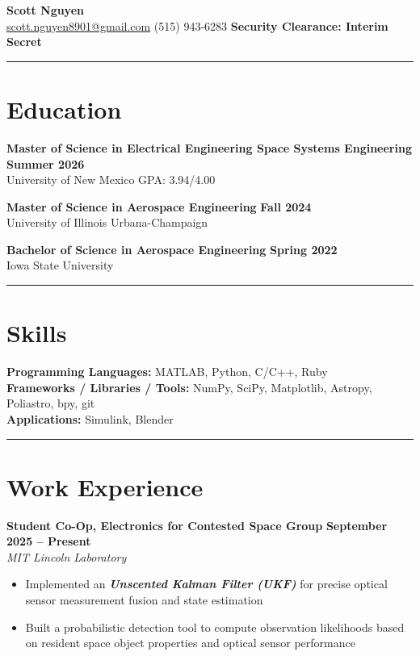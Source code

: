 \documentclass[10pt]{article}
\newcommand{\sectionline}{\noindent\rule{\linewidth}{0.4pt}}
\begin{document}
	
	\begin{center}
		{\color{mygreen}
			{\Huge \textbf{Scott Nguyen}} \\
			\small
			\href{mailto:scott.nguyen8901@gmail.com}{scott.nguyen8901@gmail.com} \textbar
			(515) 943-6283 %
			\textbf{Security Clearance: Interim Secret}
		}
	\end{center}

	\sectionline
	
	\section*{Education}
	
	\textbf{Master of Science in Electrical Engineering \textbar Space Systems Engineering} \hfill \textbf{Summer 2026} \\
	University of New Mexico \hfill GPA: 3.94/4.00
	
	\textbf{Master of Science in Aerospace Engineering} \hfill \textbf{Fall 2024} \\
	University of Illinois Urbana-Champaign
	
	\textbf{Bachelor of Science in Aerospace Engineering} \hfill \textbf{Spring 2022} \\
	Iowa State University
	
	\sectionline
	
	\section*{Skills}
	\textbf{Programming Languages:} MATLAB, Python, C/C++, Ruby \\
	\textbf{Frameworks / Libraries / Tools:} NumPy, SciPy, Matplotlib, Astropy, Poliastro, bpy, git \\
	\textbf{Applications:} Simulink, Blender
	
	\sectionline
	
	\section*{Work Experience}

	\textbf{Student Co-Op, Electronics for Contested Space Group} \hfill \textbf{September 2025 – Present} \\
	\emph{MIT Lincoln Laboratory}
	\begin{itemize}
		\item Implemented an \textbf{\emph{Unscented Kalman Filter (UKF)}} for precise optical sensor measurement fusion and state estimation
		\item Built a probabilistic detection tool to compute observation likelihoods based on resident space object properties and optical sensor performance
	\end{itemize}
\end{document}
